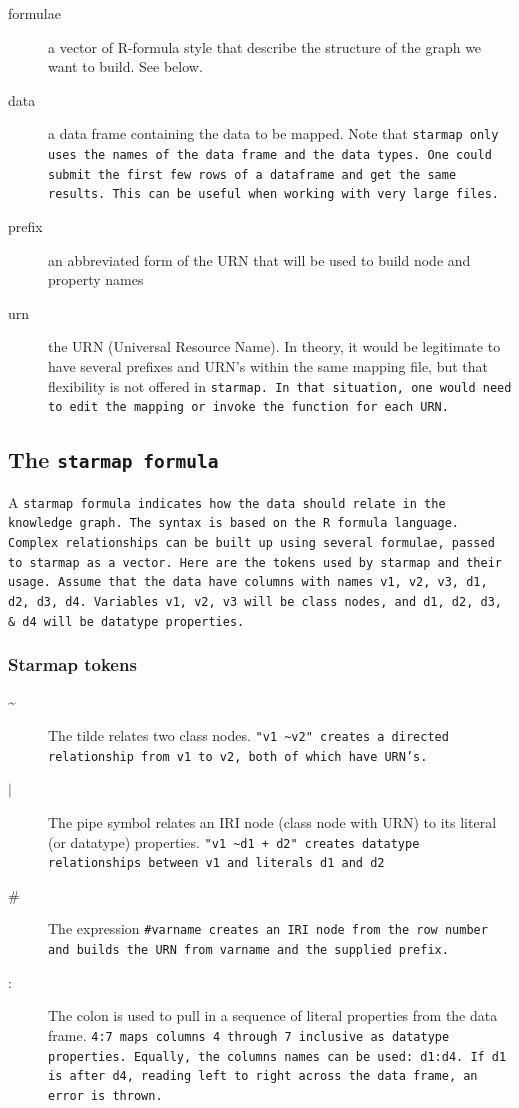\documentclass{article}\usepackage[]{graphicx}\usepackage[]{xcolor}
\begin{document}
\begin{description}
\item[formulae] a vector of R-formula style that describe the structure of the graph we want to build. See below.
\item[data] a data frame containing the data to be mapped. Note that \tt{starmap} only uses the names of the data frame and the data types. One could submit the first few rows of a dataframe and get the same results. This can be useful when working with very large files.
\item[prefix] an abbreviated form of the URN that will be used to build node and property names
\item[urn] the URN (Universal Resource Name). In theory, it would be legitimate to have several prefixes and URN's within the same mapping file, but that flexibility is not offered in \tt{starmap}. In that situation, one would need to edit the mapping or invoke the function for each URN.
\end{description}

\subsection{The \tt{starmap} formula}

A \tt{starmap} formula indicates how the data should relate in the knowledge graph. The syntax is based on the R formula language. Complex relationships can be built up using several formulae, passed to \tt{starmap} as a vector. Here are the tokens used by \tt{starmap} and their usage. Assume that the data have columns with names v1, v2, v3, d1, d2, d3, d4. Variables v1, v2, v3 will be class nodes, and d1, d2, d3, \& d4 will be datatype properties.

\subsubsection{Starmap tokens}

\begin{description}
\item[\textasciitilde] The tilde relates two class nodes. \tt{"v1 \textasciitilde  v2"} creates a directed relationship from v1 to v2, both of which have URN's.
\item[$\vert$] The pipe symbol relates an IRI node (class node with URN) to its literal (or datatype) properties. \tt{"v1  \textasciitilde d1 + d2"} creates datatype relationships between \tt{v1} and literals \tt{d1} and \tt{d2}
\item[\#] The expression \tt{\#varname} creates an IRI node from the row number and builds the URN from \tt{varname} and the supplied prefix.
\item[:] The colon is used to pull in a sequence of literal properties from the data frame. \tt{4:7} maps columns 4 through 7 inclusive as datatype properties. Equally, the columns names can be used: \tt{d1:d4}. If d1 is after d4, reading left to right across the data frame, an error is thrown.
\end{description}
\end{document}
